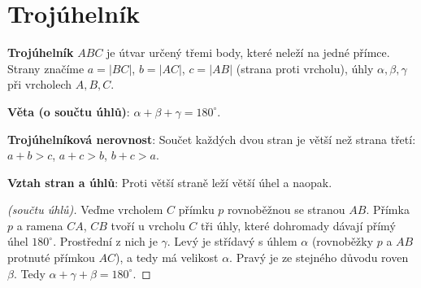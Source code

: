 \section{Trojúhelník}\label{sec:trojuhelnik}

\begin{definitionbox}
  \textbf{Trojúhelník} $ABC$ je útvar určený třemi body, které neleží na jedné přímce. Strany značíme $a = |BC|$, $b = |AC|$, $c = |AB|$ (strana proti vrcholu), úhly $\alpha, \beta, \gamma$ při vrcholech $A, B, C$.

  \vspace{0.2cm}

  \textbf{Věta (o součtu úhlů)}: $\alpha + \beta + \gamma = 180^\circ$.

  \textbf{Trojúhelníková nerovnost}: Součet každých dvou stran je větší než strana třetí: $a + b > c$, $a + c > b$, $b + c > a$.

  \textbf{Vztah stran a úhlů}: Proti větší straně leží větší úhel a naopak.
\end{definitionbox}

\begin{proof}[(součtu úhlů)]
  Veďme vrcholem $C$ přímku $p$ rovnoběžnou se stranou $AB$. Přímka $p$ a ramena $CA$, $CB$ tvoří u vrcholu $C$ tři úhly, které dohromady dávají přímý úhel $180^\circ$. Prostřední z nich je $\gamma$. Levý je střídavý s úhlem $\alpha$ (rovnoběžky $p$ a $AB$ protnuté přímkou $AC$), a tedy má velikost $\alpha$. Pravý je ze stejného důvodu roven $\beta$. Tedy $\alpha + \gamma + \beta = 180^\circ$.
\end{proof}

\begin{center}
\end{center}

